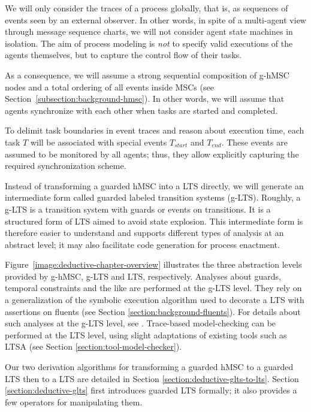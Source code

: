 We will only consider the traces of a process globally, that is, as sequences of events seen by an external observer. In other words, in spite of a multi-agent view through message sequence charts, we will not consider agent state machines in isolation. The aim of process modeling is \emph{not} to specify valid executions of the agents themselves, but to capture the control flow of their tasks. 

As a consequence, we will assume a strong sequential composition of g-hMSC nodes and a total ordering of all events inside MSCs (see Section~\ref{subsection:background-hmsc}). In other words, we will assume that agents synchronize with each other when tasks are started and completed. 

To delimit task boundaries in event traces and reason about execution time, each task $T$ will be associated with special events $T_{start}$ and $T_{end}$. These events are assumed to be monitored by all agents; thus, they allow explicitly capturing the required synchronization scheme.

Instead of transforming a guarded hMSC into a LTS directly, we will generate an intermediate form called guarded labeled transition systems (g-LTS). Roughly, a g-LTS is a transition system with guards or events on transitions. It is a structured form of LTS aimed to avoid state explosion. This intermediate form is therefore easier to understand and supports different types of analysis at an abstract level; it may also facilitate code generation for process enactment. 

Figure~\ref{image:deductive-chapter-overview} illustrates the three abstraction levels provided by g-hMSC, g-LTS and LTS, respectively. Analyses about guards, temporal constraints and the like are performed at the g-LTS level. They rely on a generalization of the symbolic execution algorithm used to decorate a LTS with assertions on fluents (see Section \ref{section:background-fluents}). For details about such analyses at the g-LTS level, see \cite{Damas:2011}. Trace-based model-checking can be performed at the LTS level, using slight adaptations of existing tools such as LTSA \cite{Magee:1999} (see Section \ref{section:tool-model-checker}).

Our two derivation algorithms for transforming a guarded hMSC to a guarded LTS then to a LTS are detailed in Section \ref{section:deductive-glts-to-lts}. Section \ref{section:deductive-glts} first introduces guarded LTS formally; it also provides a few operators for manipulating them.
